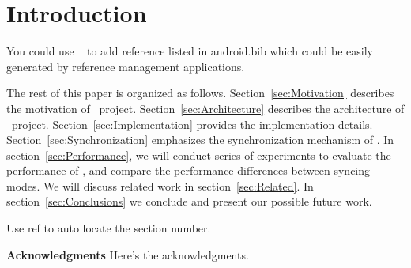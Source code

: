 \section{Introduction}
\label{sec:Introduction}

You could use ~\cite{Google:2008} to add reference listed in android.bib 
which could be easily generated by reference management applications.


The rest of this paper is organized as follows.
Section~\ref{sec:Motivation} describes the motivation of \teledroid\ project.
Section~\ref{sec:Architecture} describes the architecture of \teledroid\ project.
Section~\ref{sec:Implementation} provides the implementation details.
Section~\ref{sec:Synchronization} emphasizes the synchronization mechanism of \teledroid.
In section~\ref{sec:Performance}, we will conduct series of experiments to evaluate the performance of \teledroid, and compare the performance differences between syncing modes. 
We will discuss related work in section~\ref{sec:Related}. 
In section~\ref{sec:Conclusions} we conclude and present our possible future work.

Use ref to auto locate the section number.

{\bf Acknowledgments}  Here's the acknowledgments.